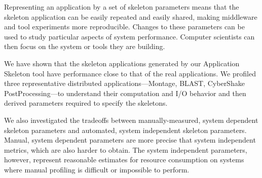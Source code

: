 \documentclass[preprint,12pt]{elsarticle}
\newcommand{\katznote}[1]{ {\textcolor{blue}    { ***Dan:   #1 }}}
\newcommand{\zhaonote}[1]{{\textcolor{darkgreen}{ ***Zhao:  #1 }}}
\newcommand{\katznote}[1]{}
\newcommand{\zhaonote}[1]{}
\begin{document}
Representing an application by a set of skeleton parameters means that the skeleton application  can be easily repeated and easily shared, making 
middleware and tool experiments more reproducible.  Changes to these parameters can be used to
study particular aspects of system performance.
Computer scientists can then focus on the system or tools they are building.

We have shown that the skeleton applications generated by our Application Skeleton tool have performance close to that of the real applications.  We profiled three representative distributed applications---Montage, BLAST, CyberShake PostProcessing---to understand their computation and I/O behavior and then derived parameters required to specify
the skeletons.  

We also investigated the tradeoffs between manually-measured, system dependent skeleton parameters and
automated, system independent skeleton parameters. Manual, system dependent parameters are more precise that system
independent metrics, which are also harder to obtain.  The system independent parameters, however, represent reasonable
estimates for resource consumption on systems where manual
profiling is difficult or impossible to perform.

\end{document}
